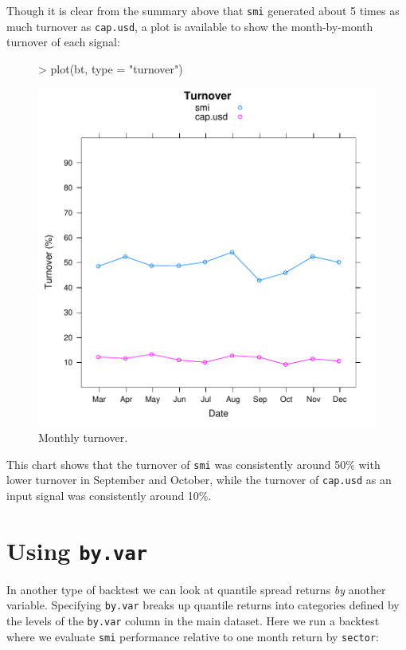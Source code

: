 \documentclass[a4paper]{report}
\begin{document}
\begin{article}
Though it is clear from the summary above that \texttt{smi} generated
about 5 times as much turnover as \texttt{cap.usd}, a plot is
available to show the month-by-month turnover of each signal:

\begin{figure}
\centering
\vspace*{.1in}
\begin{Schunk}
\begin{Sinput}
> plot(bt, type = "turnover")
\end{Sinput}
\end{Schunk}
\includegraphics{backtest-022}
\caption{\label{figure:turnover}
Monthly turnover.}
\end{figure}

This chart shows that the turnover of \texttt{smi} was consistently
around 50\% with lower turnover in September and October, while the
turnover of \texttt{cap.usd} as an input signal was consistently
around 10\%.

\section*{Using \texttt{by.var}}

In another type of backtest we can look at quantile spread returns
\emph{by} another variable.  Specifying \texttt{by.var} breaks up
quantile returns into categories defined by the levels of the
\texttt{by.var} column in the main dataset.  Here we run a backtest
where we evaluate \texttt{smi} performance relative to one month
return by \texttt{sector}:



\end{article}
\end{document}
